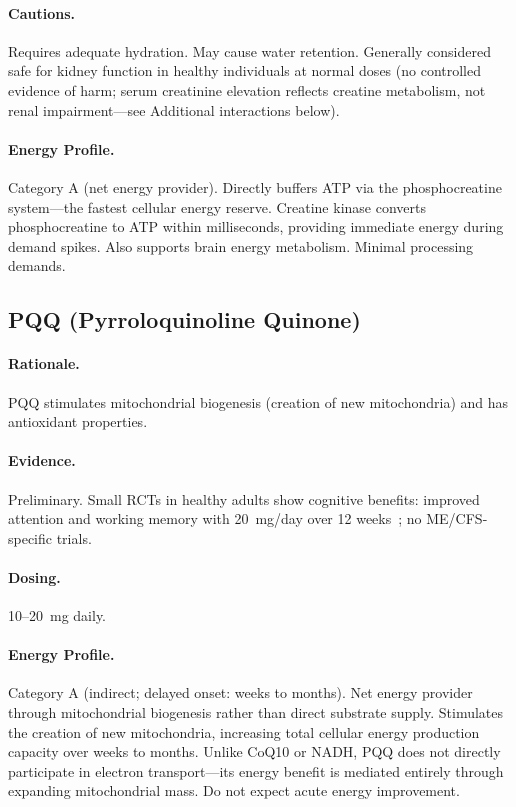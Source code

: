 \paragraph{Cautions.} Requires adequate hydration. May cause water retention. Generally considered safe for kidney function in healthy individuals at normal doses (no controlled evidence of harm; serum creatinine elevation reflects creatine metabolism, not renal impairment---see Additional interactions below).

\paragraph{Energy Profile.}
Category A (net energy provider). Directly buffers ATP via the phosphocreatine system---the fastest cellular energy reserve. Creatine kinase converts phosphocreatine to ATP within milliseconds, providing immediate energy during demand spikes. Also supports brain energy metabolism. Minimal processing demands.

\subsection{PQQ (Pyrroloquinoline Quinone)}

\paragraph{Rationale.} PQQ stimulates mitochondrial biogenesis (creation of new mitochondria) and has antioxidant properties.

\paragraph{Evidence.} Preliminary. Small RCTs in healthy adults show cognitive benefits: improved attention and working memory with 20~mg/day over 12 weeks~\cite{Tamakoshi2023PQQbrain,Shiojima2022PQQcognitive}; no ME/CFS-specific trials.

\paragraph{Dosing.} 10--20~mg daily.

\paragraph{Energy Profile.}
Category A (indirect; delayed onset: weeks to months). Net energy provider through mitochondrial biogenesis rather than direct substrate supply. Stimulates the creation of new mitochondria, increasing total cellular energy production capacity over weeks to months. Unlike CoQ10 or NADH, PQQ does not directly participate in electron transport---its energy benefit is mediated entirely through expanding mitochondrial mass. Do not expect acute energy improvement.

